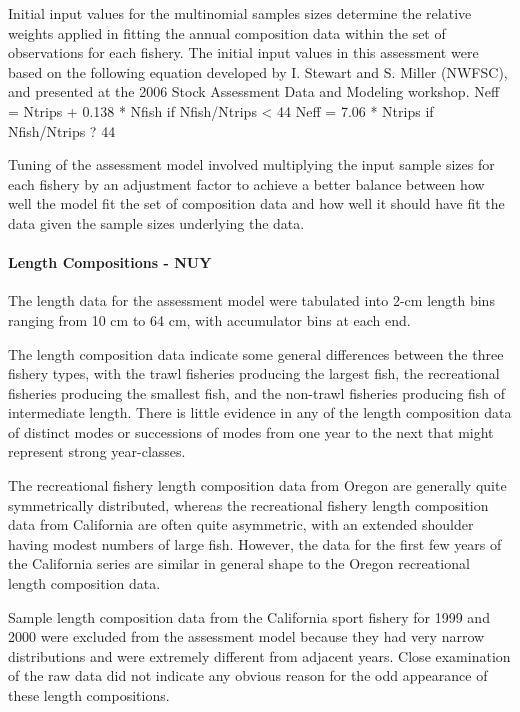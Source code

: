 \documentclass[11pt,
  english,
  letterpaper,
]{article}
\begin{document}
Initial input values for the multinomial samples sizes determine the relative weights applied in fitting the annual composition data within the set of observations for each fishery. The initial input values in this assessment were based on the following equation developed by I. Stewart and S. Miller (NWFSC), and presented at the 2006 Stock Assessment Data and Modeling workshop. Neff = Ntrips + 0.138 * Nfish if Nfish/Ntrips \textless{} 44 Neff = 7.06 * Ntrips if Nfish/Ntrips ? 44

Tuning of the assessment model involved multiplying the input sample sizes for each fishery by an adjustment factor to achieve a better balance between how well the model fit the set of composition data and how well it should have fit the data given the sample sizes underlying the data.

\hypertarget{length-compositions---nuy}{%
\paragraph{Length Compositions - NUY}\label{length-compositions---nuy}}

The length data for the assessment model were tabulated into 2-cm length bins ranging from 10 cm to 64 cm, with accumulator bins at each end.

The length composition data indicate some general differences between the three fishery types, with the trawl fisheries producing the largest fish, the recreational fisheries producing the smallest fish, and the non-trawl fisheries producing fish of intermediate length. There is little evidence in any of the length composition data of distinct modes or successions of modes from one year to the next that might represent strong year-classes.

The recreational fishery length composition data from Oregon are generally quite symmetrically distributed, whereas the recreational fishery length composition data from California are often quite asymmetric, with an extended shoulder having modest numbers of large fish. However, the data for the first few years of the California series are similar in general shape to the Oregon recreational length composition data.

Sample length composition data from the California sport fishery for 1999 and 2000 were excluded from the assessment model because they had very narrow distributions and were extremely different from adjacent years. Close examination of the raw data did not indicate any obvious reason for the odd appearance of these length compositions.
\end{document}
